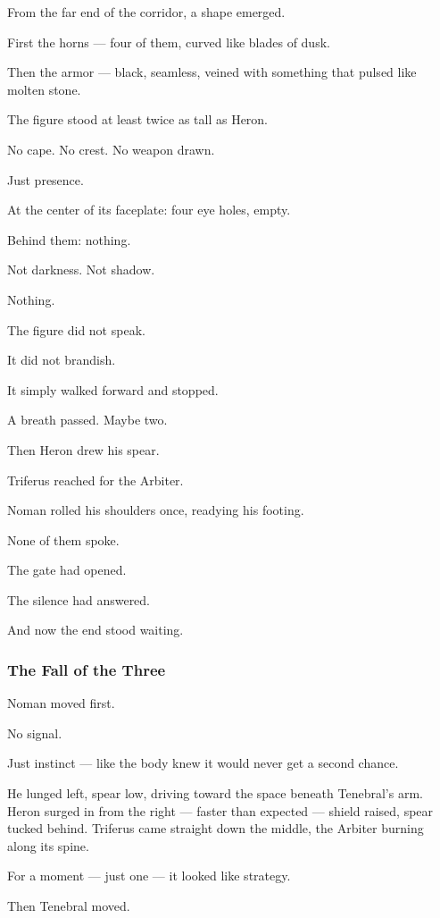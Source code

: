 \documentclass[12pt]{article}
\begin{document}
From the far end of the corridor, a shape emerged.

First the horns — four of them, curved like blades of dusk.

Then the armor — black, seamless, veined with something that pulsed like molten stone.

The figure stood at least twice as tall as Heron.

No cape. No crest. No weapon drawn.

Just presence.

At the center of its faceplate: four eye holes, empty.

Behind them: nothing.

Not darkness. Not shadow.

Nothing.

\bigskip

The figure did not speak.

It did not brandish.

It simply walked forward and stopped.

A breath passed. Maybe two.

Then Heron drew his spear.

Triferus reached for the Arbiter.

Noman rolled his shoulders once, readying his footing.

None of them spoke.

The gate had opened.

The silence had answered.

And now the end stood waiting.

\dotfill

\subsubsection{The Fall of the Three}

Noman moved first.

No signal.

Just instinct — like the body knew it would never get a second chance.

He lunged left, spear low, driving toward the space beneath Tenebral’s arm. Heron surged in from the right — faster than expected — shield raised, spear tucked behind. Triferus came straight down the middle, the Arbiter burning along its spine.

For a moment — just one — it looked like strategy.

Then Tenebral moved.
\end{document}
